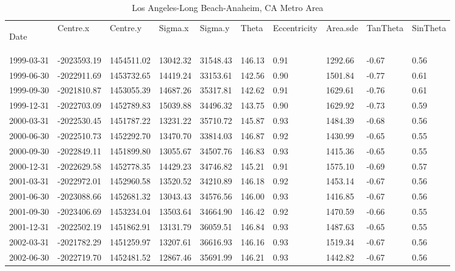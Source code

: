 \begin{landscape}
\singlespacing
\small
\centering
\begin{longtable}{llllllllll}

\caption{Los Angeles-Long Beach-Anaheim, CA Metro Area} 
\endfirsthead
\caption{Los Angeles-Long Beach-Anaheim, CA Metro Area} 
\endhead
\label{tab:LA_SE} 

Date       & Centre.x   & Centre.y   & Sigma.x  & Sigma.y  & Theta  & Eccentricity & Area.sde & TanTheta & SinTheta \\

1999-03-31 & -2023593.19 & 1454511.02 & 13042.32 & 31548.43 & 146.13 & 0.91 & 1292.66 & -0.67 & 0.56 \\
1999-06-30 & -2022911.69 & 1453732.65 & 14419.24 & 33153.61 & 142.56 & 0.90 & 1501.84 & -0.77 & 0.61 \\
1999-09-30 & -2021810.87 & 1453055.39 & 14687.26 & 35317.81 & 142.62 & 0.91 & 1629.61 & -0.76 & 0.61 \\
1999-12-31 & -2022703.09 & 1452789.83 & 15039.88 & 34496.32 & 143.75 & 0.90 & 1629.92 & -0.73 & 0.59 \\
2000-03-31 & -2022530.45 & 1451787.22 & 13231.22 & 35710.72 & 145.87 & 0.93 & 1484.39 & -0.68 & 0.56 \\
2000-06-30 & -2022510.73 & 1452292.70 & 13470.70 & 33814.03 & 146.87 & 0.92 & 1430.99 & -0.65 & 0.55 \\
2000-09-30 & -2022849.11 & 1451899.80 & 13055.67 & 34507.76 & 146.83 & 0.93 & 1415.36 & -0.65 & 0.55 \\
2000-12-31 & -2022629.58 & 1452778.35 & 14429.23 & 34746.82 & 145.21 & 0.91 & 1575.10 & -0.69 & 0.57 \\
2001-03-31 & -2022972.01 & 1452960.58 & 13520.52 & 34210.89 & 146.18 & 0.92 & 1453.14 & -0.67 & 0.56 \\
2001-06-30 & -2023088.66 & 1452681.32 & 13043.43 & 34576.56 & 146.00 & 0.93 & 1416.85 & -0.67 & 0.56 \\
2001-09-30 & -2023406.69 & 1453234.04 & 13503.64 & 34664.90 & 146.42 & 0.92 & 1470.59 & -0.66 & 0.55 \\
2001-12-31 & -2022502.19 & 1451862.91 & 13131.79 & 36059.51 & 146.84 & 0.93 & 1487.63 & -0.65 & 0.55 \\
2002-03-31 & -2021782.29 & 1451259.97 & 13207.61 & 36616.93 & 146.16 & 0.93 & 1519.34 & -0.67 & 0.56 \\
2002-06-30 & -2022719.70 & 1452481.52 & 12867.46 & 35691.99 & 146.21 & 0.93 & 1442.82 & -0.67 & 0.56 \\

\end{longtable}
\end{landscape}
